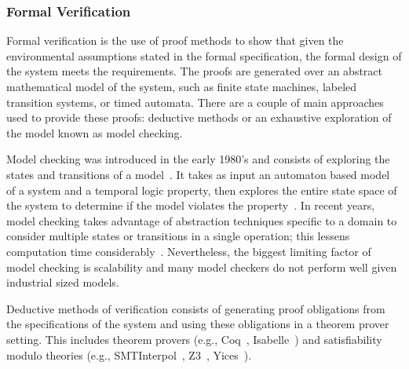 \subsubsection{Formal Verification} 
Formal verification is the use of proof methods to show that given the environmental assumptions stated in the formal specification, the formal design of the system meets the requirements. The proofs are generated over an abstract mathematical model of the system, such as finite state machines, labeled transition systems, or timed automata. There are a couple of main approaches used to provide these proofs: deductive methods or an exhaustive exploration of the model known as model checking. 

Model checking was introduced in the early 1980's and consists of exploring the states and transitions of a model~\cite{clarke1981design,queille1982specification}. It takes as input an automaton based model of a system and a temporal logic property, then explores the entire state space of the system to determine if the model violates the property~\cite{fraser2009testing}. In recent years, model checking takes advantage of abstraction techniques specific to a domain to consider multiple states or transitions in a single operation; this lessens computation time considerably~\cite{d2008survey}. Nevertheless, the biggest limiting factor of model checking is scalability and many model checkers do not perform well given industrial sized models. 

Deductive methods of verification consists of generating proof obligations from the specifications of the system and using these obligations in a theorem prover setting. This includes theorem provers (e.g., Coq~\cite{coq}, Isabelle~\cite{isabelle}) and satisfiability modulo theories (e.g., SMTInterpol~\cite{smtInterpol}, Z3~\cite{z3}, Yices~\cite{yices}). 


 



